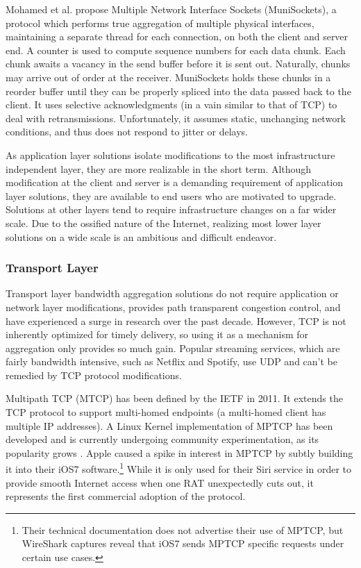 \documentclass[12pt]{article}
\begin{document}
		Mohamed et al. propose Multiple Network Interface Sockets (MuniSockets), a protocol which performs true aggregation of multiple physical interfaces, maintaining a separate thread for each connection, on both the client and server end. A counter is used to compute sequence numbers for each data chunk. Each chunk awaits a vacancy in the send buffer before it is sent out. Naturally, chunks may arrive out of order at the receiver. MuniSockets holds these chunks in a reorder buffer until they can be properly spliced into the data passed back to the client. It uses selective acknowledgments (in a vain similar to that of TCP) to deal with retransmissions. Unfortunately, it assumes static, unchanging network conditions, and thus does not respond to jitter or delays\cite{mohamed2002user}.

		As application layer solutions isolate modifications to the most infrastructure independent layer, they are more realizable in the short term. Although modification at the client and server is a demanding requirement of application layer solutions, they are available to end users who are motivated to upgrade. Solutions at other layers tend to require infrastructure changes on a far wider scale. Due to the ossified nature of the Internet, realizing most lower layer solutions on a wide scale is an ambitious and difficult endeavor.

	\subsubsection{Transport Layer}

		Transport layer bandwidth aggregation solutions do not require application or network layer modifications, provides path transparent congestion control, and have experienced a surge in research over the past decade\cite{5763587}. However, TCP is not inherently optimized for timely delivery, so using it as a mechanism for aggregation only provides so much gain. Popular streaming services, which are fairly bandwidth intensive, such as Netflix and Spotify, use UDP and can't be remedied by TCP protocol modifications.

		Multipath TCP (MTCP) has been defined by the IETF in 2011. It extends the TCP protocol to support multi-homed endpoints (a multi-homed client has multiple IP addresses). A Linux Kernel implementation of MPTCP has been developed and is currently undergoing community experimentation, as its popularity grows \cite{barre2011multipath}. Apple caused a spike in interest in MPTCP by subtly building it into their iOS7 software.\footnote{Their technical documentation does not advertise their use of MPTCP, but WireShark captures reveal that iOS7 sends MPTCP specific requests under certain use cases.} While it is only used for their Siri service in order to provide smooth Internet access when one RAT unexpectedly cuts out, it represents the first commercial adoption of the protocol.
\end{document}

